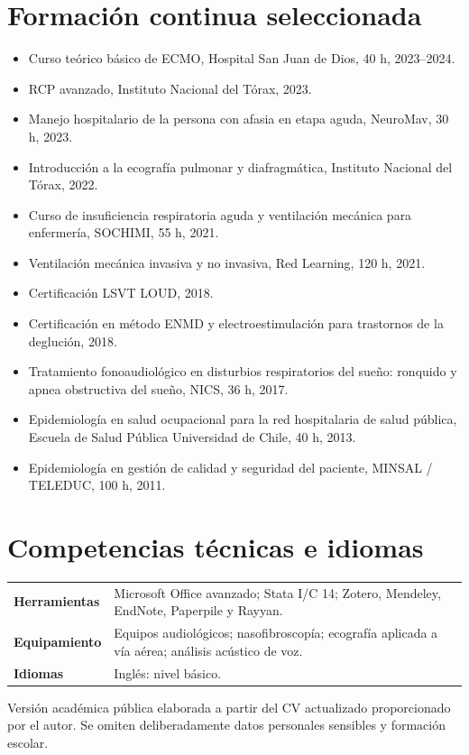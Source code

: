 \documentclass[10pt,a4paper]{article}
\begin{document}
\section*{Formación continua seleccionada}
\begin{itemize}
  \item Curso teórico básico de ECMO, Hospital San Juan de Dios, 40 h, 2023--2024.
  \item RCP avanzado, Instituto Nacional del Tórax, 2023.
  \item Manejo hospitalario de la persona con afasia en etapa aguda, NeuroMav, 30 h, 2023.
  \item Introducción a la ecografía pulmonar y diafragmática, Instituto Nacional del Tórax, 2022.
  \item Curso de insuficiencia respiratoria aguda y ventilación mecánica para enfermería, SOCHIMI, 55 h, 2021.
  \item Ventilación mecánica invasiva y no invasiva, Red Learning, 120 h, 2021.
  \item Certificación LSVT LOUD, 2018.
  \item Certificación en método ENMD y electroestimulación para trastornos de la deglución, 2018.
  \item Tratamiento fonoaudiológico en disturbios respiratorios del sueño: ronquido y apnea obstructiva del sueño, NICS, 36 h, 2017.
  \item Epidemiología en salud ocupacional para la red hospitalaria de salud pública, Escuela de Salud Pública Universidad de Chile, 40 h, 2013.
  \item Epidemiología en gestión de calidad y seguridad del paciente, MINSAL / TELEDUC, 100 h, 2011.
\end{itemize}

\section*{Competencias técnicas e idiomas}
\begin{tabularx}{\textwidth}{>{\bfseries}p{} X}
Herramientas & Microsoft Office avanzado; Stata I/C 14; Zotero, Mendeley, EndNote, Paperpile y Rayyan.\\
Equipamiento & Equipos audiológicos; nasofibroscopía; ecografía aplicada a vía aérea; análisis acústico de voz.\\
Idiomas & Inglés: nivel básico.\\
\end{tabularx}

\vfill
{\small\color{textgray}Versión académica pública elaborada a partir del CV actualizado proporcionado por el autor. Se omiten deliberadamente datos personales sensibles y formación escolar.}
\end{document}
